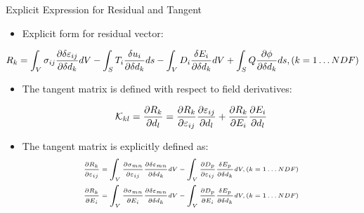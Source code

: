 \documentclass{beamer}
\begin{document}
\begin{frame}{Explicit Expression for Residual and Tangent}
  \begin{itemize}
  \item Explicit form for residual vector:
\end{itemize}

\begin{equation}
\fontsize{7pt}{7pt}
R_k=\int_V \sigma_{ij} \frac{\partial \delta \varepsilon_{ij}}{\partial \delta d_k}  dV-\int_S T_{i} \frac{\delta u_{i}}{\partial \delta d_k}  ds-\int_V D_i \frac{\delta E_{i}}{\partial \delta d_k} dV+\int_S Q \frac{\partial \phi}{\partial \delta d_k}ds ,(k=1\dots NDF)
\label{EQN:ExplicitResidualRepresentation}
\end{equation}

\begin{itemize}
\item The tangent matrix is defined with respect to field derivatives:

\begin{equation}
\fontsize{8pt}{8pt}
\mathcal{K}_{kl} =\frac{\partial R_k}{\partial d_l}=\frac{\partial R_k}{\partial \varepsilon_{ij}}\frac{\partial \varepsilon_{ij}}{\partial d_l}+\frac{\partial R_k}{\partial E_{i}}\frac{\partial E_{i}}{\partial d_l}
\label{EQN:ExplcitTangentRepresentation}
\end{equation}
\end{itemize}

\begin{itemize}
\item The tangent matrix is explicitly defined as:
\begin{equation}
\fontsize{6pt}{6pt}
\begin{aligned}
&\frac{\partial R_k}{\partial \varepsilon_{ij}}=\int_V  \frac{\partial \sigma_{mn}}{\partial \varepsilon_{ij}} \frac{\partial \delta \varepsilon_{mn}}{\partial \delta d_k}  dV-\int_V \frac{\partial D_{p}}{\partial \varepsilon_{ij}}  \frac{\delta E_{p}}{\partial \delta d_k} dV  ,(k=1\dots NDF)\\
&\frac{\partial R_k}{\partial E_{i}}=\int_V  \frac{\partial \sigma_{mn}}{\partial E_{i}} \frac{\partial \delta \varepsilon_{mn}}{\partial \delta d_k}  dV-\int_V \frac{\partial D_{p}}{\partial E_{i}}  \frac{\delta E_{p}}{\partial \delta d_k} dV  ,(k=1\dots NDF)
\end{aligned}
\label{EQN:StressExplcitTangent}
\end{equation}
\end{itemize}
\end{frame}
\end{document}
